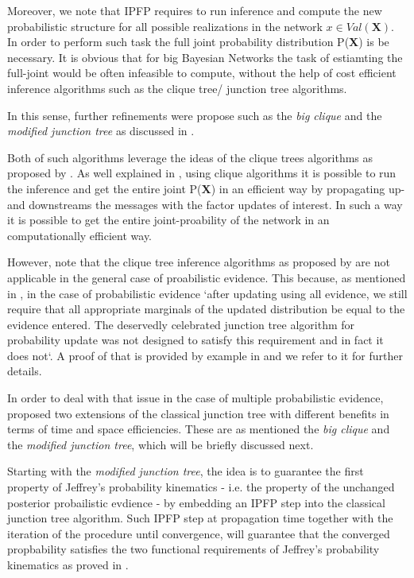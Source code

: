 \documentclass[11pt]{article}
\begin{document}
\begin{article}
Moreover, we note that IPFP requires to run inference and compute the
new probabilistic structure for all possible realizations in the
network \(x \in Val(\textbf{X})\). In order to perform such task the
full joint probability distribution P(\textbf{X}) is be necessary. It
is obvious that for big Bayesian Networks the task of estiamting the
full-joint would be often infeasible to compute, without the help of cost
efficient inference algorithms such as the clique tree/ junction tree algorithms.

In this sense, further refinements were propose such as the \emph{big
clique} and the \emph{modified junction tree} as discussed in
\cite{Valtorta_2002}.

Both of such algorithms leverage the ideas of the clique trees
algorithms as proposed by \cite{shafer1990probability}. As well
explained in \cite{koller2009probabilistic}, using clique algorithms
it is possible to run the inference and get the entire joint
P(\textbf{X}) in an efficient way by propagating up- and downstreams
the messages with the factor updates of interest. In such a way it is
possible to get the entire joint-proability of the network in an
computationally efficient way.

However, note that the clique tree inference algorithms as proposed by
\cite{shafer1990probability} are not applicable in the general case of
proabilistic evidence. This because, as mentioned in
\cite{Valtorta_2002}, in the case of probabilistic evidence `after
updating using all evidence, we still require that all appropriate
marginals of the updated distribution be equal to the evidence
entered. The deservedly celebrated junction tree algorithm for
probability update was not designed to satisfy this requirement and in
fact it does not`. A proof of that is provided by example in
\cite{Valtorta_2002} and we refer to it for further details.

In order to deal with that issue in the case of multiple probabilistic evidence,
\cite{Valtorta_2002} proposed two extensions of the classical junction
tree with different benefits in terms of time and space
efficiencies. These are as mentioned the \emph{big clique} and the
\emph{modified junction tree}, which will be briefly discussed next.

Starting with the \emph{modified junction tree}, the idea is to
guarantee the first property of Jeffrey's probability kinematics -
i.e. the property of the unchanged posterior probailistic evdience -
by embedding an IPFP step into the classical junction tree
algorithm. Such IPFP step at propagation time together with the
iteration of the procedure until convergence, will guarantee that the
converged propbability satisfies the two functional requirements of
Jeffrey's probability kinematics as proved in
\cite{csiszar1975divergence}.


\end{article}
\end{document}
